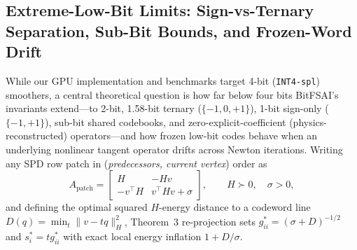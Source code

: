 \documentclass[10pt]{article}
\begin{document}
\subsection{Extreme-Low-Bit Limits: Sign-vs-Ternary Separation, Sub-Bit Bounds, and Frozen-Word Drift}\label{sec:bit_limits}
While our GPU implementation and benchmarks target 4-bit (\texttt{INT4-spl}) smoothers, a central theoretical question is how far below four bits BitFSAI's invariants extend---to 2-bit, 1.58-bit ternary ($\{-1, 0, +1\}$), 1-bit sign-only ($\{-1, +1\}$), sub-bit shared codebooks, and zero-explicit-coefficient (physics-reconstructed) operators---and how frozen low-bit codes behave when an underlying nonlinear tangent operator drifts across Newton iterations. Writing any SPD row patch in (\emph{predecessors, current vertex}) order as
\[
  A_{\mathrm{patch}} = \begin{bmatrix}H & -H v\\ -v^\top H & v^\top H v + \sigma\end{bmatrix}, \qquad H \succ 0, \quad \sigma > 0,
\]
and defining the optimal squared $H$-energy distance to a codeword line $D(q) = \min_t \|v - t q\|_H^2$, Theorem~3 re-projection sets $g_{ii}^* = (\sigma + D)^{-1/2}$ and $s_i^* = t g_{ii}^*$ with exact local energy inflation $1 + D/\sigma$.
\end{document}
